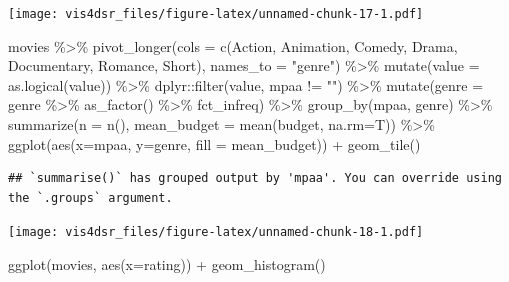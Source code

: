 \documentclass[
]{krantz}
\makeatletter
\newenvironment{Shaded}{\begin{snugshade}}{\end{snugshade}}
\newcommand{\AttributeTok}[1]{\textcolor[rgb]{0.61,0.61,0.61}{#1}}
\newcommand{\FunctionTok}[1]{\textcolor[rgb]{0,0,0}{#1}}
\newcommand{\NormalTok}[1]{#1}
\newcommand{\SpecialCharTok}[1]{\textcolor[rgb]{0,0,0}{#1}}
\newcommand{\StringTok}[1]{\textcolor[rgb]{0.5,0.5,0.5}{#1}}
\newenvironment{kframe}{%
\medskip{}
\setlength{\fboxsep}{.8em}
 \def\at@end@of@kframe{}%
 \ifinner\ifhmode%
  \def\at@end@of@kframe{\end{minipage}}%
  \begin{minipage}{\columnwidth}%
 \fi\fi%
 \def\FrameCommand##1{\hskip\@totalleftmargin \hskip-\fboxsep
 \colorbox{shadecolor}{##1}\hskip-\fboxsep
     \hskip-\linewidth \hskip-\@totalleftmargin \hskip\columnwidth}%
 \MakeFramed {\advance\hsize-\width
   \@totalleftmargin\z@ \linewidth\hsize
   \@setminipage}}%
 {\par\unskip\endMakeFramed%
 \at@end@of@kframe}
\renewenvironment{Shaded}{\begin{kframe}}{\end{kframe}}
\makeatother
\begin{document}
\texttt{[image: vis4dsr\_files/figure-latex/unnamed-chunk-17-1.pdf]}

\begin{Shaded}
\begin{Highlighting}[]
\NormalTok{movies }\SpecialCharTok{\%\textgreater{}\%} 
  \FunctionTok{pivot\_longer}\NormalTok{(}\AttributeTok{cols =} \FunctionTok{c}\NormalTok{(Action, Animation, Comedy, Drama, Documentary, Romance, Short), }\AttributeTok{names\_to =} \StringTok{"genre"}\NormalTok{) }\SpecialCharTok{\%\textgreater{}\%}
  \FunctionTok{mutate}\NormalTok{(}\AttributeTok{value =} \FunctionTok{as.logical}\NormalTok{(value)) }\SpecialCharTok{\%\textgreater{}\%}
\NormalTok{  dplyr}\SpecialCharTok{::}\FunctionTok{filter}\NormalTok{(value, mpaa }\SpecialCharTok{!=} \StringTok{""}\NormalTok{) }\SpecialCharTok{\%\textgreater{}\%}
  \FunctionTok{mutate}\NormalTok{(}\AttributeTok{genre =}\NormalTok{ genre }\SpecialCharTok{\%\textgreater{}\%}
           \FunctionTok{as\_factor}\NormalTok{() }\SpecialCharTok{\%\textgreater{}\%}
\NormalTok{           fct\_infreq) }\SpecialCharTok{\%\textgreater{}\%}
  \FunctionTok{group\_by}\NormalTok{(mpaa, genre) }\SpecialCharTok{\%\textgreater{}\%}
  \FunctionTok{summarize}\NormalTok{(}\AttributeTok{n =} \FunctionTok{n}\NormalTok{(), }\AttributeTok{mean\_budget =} \FunctionTok{mean}\NormalTok{(budget, }\AttributeTok{na.rm=}\NormalTok{T)) }\SpecialCharTok{\%\textgreater{}\%}
  \FunctionTok{ggplot}\NormalTok{(}\FunctionTok{aes}\NormalTok{(}\AttributeTok{x=}\NormalTok{mpaa, }\AttributeTok{y=}\NormalTok{genre, }\AttributeTok{fill =}\NormalTok{ mean\_budget)) }\SpecialCharTok{+}
    \FunctionTok{geom\_tile}\NormalTok{()}
\end{Highlighting}
\end{Shaded}

\begin{verbatim}
## `summarise()` has grouped output by 'mpaa'. You can override using the `.groups` argument.
\end{verbatim}

\texttt{[image: vis4dsr\_files/figure-latex/unnamed-chunk-18-1.pdf]}

\begin{Shaded}
\begin{Highlighting}[]
\FunctionTok{ggplot}\NormalTok{(movies, }\FunctionTok{aes}\NormalTok{(}\AttributeTok{x=}\NormalTok{rating)) }\SpecialCharTok{+}
  \FunctionTok{geom\_histogram}\NormalTok{()}
\end{Highlighting}
\end{Shaded}
\end{document}
